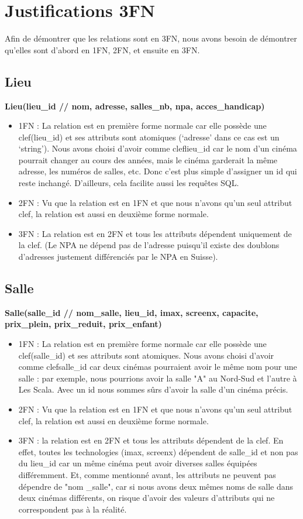 \documentclass[12pt]{article}
\begin{document}
\section{Justifications 3FN}
Afin de démontrer que les relations sont en 3FN, 
nous avons besoin de démontrer qu'elles sont d'abord en 1FN, 2FN, et ensuite en 3FN.
\subsection{Lieu}
\textbf{Lieu(lieu{\_}id // nom, adresse, salles{\_}nb, npa, acces{\_}handicap)}
\begin{itemize}
    \item 1FN : La relation est en première forme normale car elle possède une clef(lieu{\_}id) 
    et ses attributs sont atomiques (‘adresse’ dans ce cas est un ‘string’). 
    Nous avons choisi d’avoir comme cleflieu{\_}id car le nom d’un cinéma pourrait 
    changer au cours des années, mais le cinéma garderait la même adresse, les numéros de salles, etc. 
    Donc c’est plus simple d’assigner un id qui reste inchangé. D’ailleurs, cela facilite aussi les requêtes SQL.
    \item 2FN : Vu que la relation est en 1FN et que nous n'avons qu'un seul attribut clef, la relation est aussi
    en deuxième forme normale.
    \item 3FN : La relation est en 2FN et tous les attributs dépendent uniquement de la clef. (Le NPA ne dépend pas de l'adresse
    puisqu'il existe des doublons d'adresses justement différenciés par le NPA en Suisse).
\end{itemize}
\subsection{Salle}
\textbf{Salle(salle{\_}id // nom{\_}salle, lieu{\_}id, imax, screenx, capacite, prix{\_}plein, prix{\_}reduit, prix{\_}enfant)} \\
\begin{itemize}
    \item 1FN : La relation est en première forme normale car elle 
    possède une clef(salle{\_}id) et ses attributs sont atomiques. 
    Nous avons choisi d’avoir comme clefsalle{\_}id car deux cinémas 
    pourraient avoir le même nom pour une salle : par exemple, nous pourrions avoir la 
    salle "A" au Nord-Sud et l’autre à Les Scala. Avec un id nous sommes sûrs d’avoir la salle d’un cinéma précis. 
    \item 2FN : Vu que la relation est en 1FN et que nous n'avons qu'un seul attribut clef, la relation est aussi
    en deuxième forme normale.
    \item 3FN : la relation est en 2FN et tous les attributs dépendent de la clef. 
    En effet, toutes les technologies (imax, screenx) dépendent de salle{\_}id et 
    non pas du lieu{\_}id car un même cinéma peut avoir diverses salles équipées différemment. 
    Et, comme mentionné avant, les attributs ne peuvent pas dépendre de "nom {\_}salle", 
    car si nous avons deux mêmes noms de salle dans deux cinémas différents, 
    on risque d’avoir des valeurs d’attributs qui ne correspondent pas à la réalité.
\end{itemize}
\end{document}
